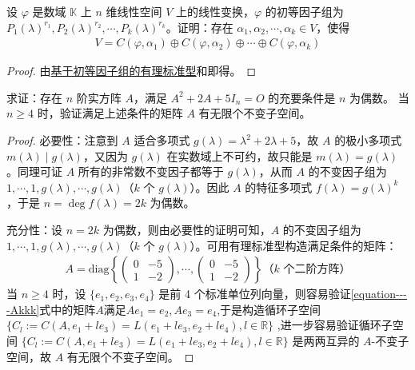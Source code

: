 \documentclass[../../main.tex]{subfiles}
\begin{document}
\begin{theorem}\label{theorem:基于初等因子组的循环子空间之和分解}
设 $\varphi$ 是数域 $\mathbb{K}$ 上 $n$ 维线性空间 $V$ 上的线性变换，$\varphi$ 的初等因子组为 $P_1(\lambda)^{r_1},P_2(\lambda)^{r_2},\cdots,P_k(\lambda)^{r_k}$。证明：存在 $\alpha_1,\alpha_2,\cdots,\alpha_k\in V$，使得
\begin{align*}
V = C(\varphi,\alpha_1)\oplus C(\varphi,\alpha_2)\oplus\cdots\oplus C(\varphi,\alpha_k)
\end{align*}
\end{theorem}
\begin{proof}
由\hyperref[theorem:基于初等因子组的有理标准型]{基于初等因子组的有理标准型}和即得。
\end{proof}

\begin{example}
求证：存在 $n$ 阶实方阵 $A$，满足 $A^2 + 2A + 5I_n = O$ 的充要条件是 $n$ 为偶数。
当 $n\geqslant  4$ 时，验证满足上述条件的矩阵 $A$ 有无限个不变子空间。
\end{example}
\begin{proof}
{\heiti 必要性：}注意到 $A$ 适合多项式 $g(\lambda)=\lambda^2 + 2\lambda + 5$，故 $A$ 的极小多项式 $m(\lambda)\mid g(\lambda)$，又因为 $g(\lambda)$ 在实数域上不可约，故只能是 $m(\lambda)=g(\lambda)$。同理可证 $A$ 所有的非常数不变因子都等于 $g(\lambda)$，从而 $A$ 的不变因子组为 $1,\cdots,1,g(\lambda),\cdots,g(\lambda)$（$k$ 个 $g(\lambda)$）。因此 $A$ 的特征多项式 $f(\lambda)=g(\lambda)^k$，于是 $n = \deg f(\lambda)=2k$ 为偶数。

{\heiti 充分性：}设 $n = 2k$ 为偶数，则由必要性的证明可知，$A$ 的不变因子组为 $1,\cdots,1,g(\lambda),\cdots,g(\lambda)$（$k$ 个 $g(\lambda)$）。可用有理标准型构造满足条件的矩阵：
\begin{align}\label{equation----Akkk}
A=\mathrm{diag}\left\{\begin{pmatrix}
0 & -5 \\
1 & -2
\end{pmatrix},\cdots,\begin{pmatrix}
0 & -5 \\
1 & -2
\end{pmatrix}\right\} \text{（$k$ 个二阶方阵）}
\end{align}
当 $n\geqslant  4$ 时，设 $\{e_1,e_2,e_3,e_4\}$ 是前 4 个标准单位列向量，则容易验证\eqref{equation----Akkk}式中的矩阵$A$满足$Ae_1=e_2,Ae_3=e_4$,于是构造循环子空间 $\{C_l := C(A,e_1 + le_3)=L(e_1 + le_3,e_2 + le_4),l\in\mathbb{R}\}$ ,进一步容易验证循环子空间 $\{C_l := C(A,e_1 + le_3)=L(e_1 + le_3,e_2 + le_4),l\in\mathbb{R}\}$ 是两两互异的 $A$-不变子空间，故 $A$ 有无限个不变子空间。
\end{proof}
\end{document}
